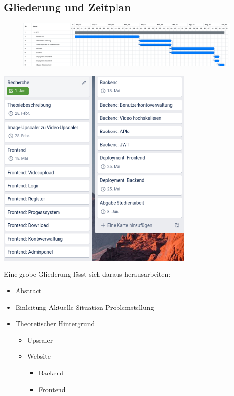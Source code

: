 \begin{onehalfspace}

\chapter{Gliederung und Zeitplan}

\begin{figure}[H]
	\includegraphics[width=\textwidth]{Bilder/Gantt}
\end{figure}

\begin{center}
	\includegraphics[height=10cm]{Bilder/Trello}
\end{center}

Eine grobe Gliederung lässt sich daraus herausarbeiten:

\begin{itemize}
	\item Abstract
	\item Einleitung
	Aktuelle Situation
	Problemstellung
	
	\item Theoretischer Hintergrund
	\begin{itemize}
		\item Upscaler
		\item Website
		\begin{itemize}
			\item Backend
			\item Frontend
		\end{itemize}
	\end{itemize}
	

\end{itemize}
\end{onehalfspace}
